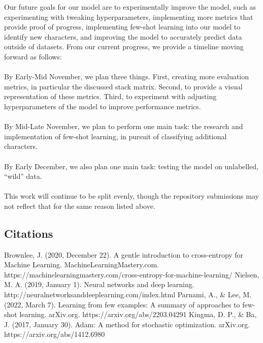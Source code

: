 \documentclass{article}
\begin{document}
Our future goals for our model are to experimentally improve the model, such as experimenting with tweaking hyperparameters, implementing more metrics that provide proof of progress, implementing few-shot learning into our model to identify new characters, and improving the model to accurately predict data outside of datasets. From our current progress, we provide a timeline moving forward as follows:\\\\

By Early-Mid November, we plan three things. First, creating more evaluation metrics, in particular the discussed stack matrix. Second, to provide a visual representation of these metrics. Third, to experiment with adjusting hyperparameters of the model to improve performance metrics.\\\\

By Mid-Late November, we plan to perform one main task: the research and implementation of few-shot learning, in pursuit of classifying additional characters.\\\\

By Early December, we also plan one main task: testing the model on unlabelled, ``wild'' data.\\\\

This work will continue to be split evenly, though the repository submissions may not reflect that for the same reason listed above.
\pagebreak
\subsection*{Citations}
Brownlee, J. (2020, December 22). A gentle introduction to cross-entropy for Machine Learning. MachineLearningMastery.com. https://machinelearningmastery.com/cross-entropy-for-machine-learning/ \newline\newline
Nielsen, M. A. (2019, January 1). Neural networks and deep learning. http://neuralnetworksanddeeplearning.com/index.html​ \newline\newline
Parnami, A., \& Lee, M. (2022, March 7). Learning from few examples: A summary of approaches to few-shot learning. arXiv.org. https://arxiv.org/abs/2203.04291 \newline\newline
Kingma, D. P., \& Ba, J. (2017, January 30). Adam: A method for stochastic optimization. arXiv.org. https://arxiv.org/abs/1412.6980 \newline\newline
\end{document}
